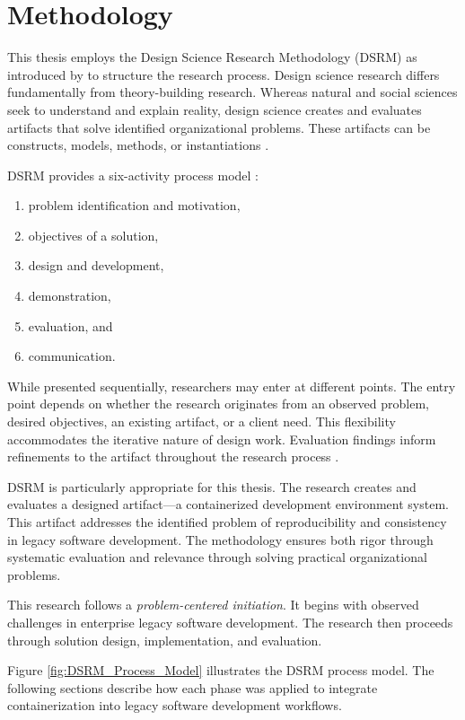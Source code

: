 \chapter{Methodology}
\label{ch:methodology}

This thesis employs the Design Science Research Methodology (DSRM) as introduced by \citet{peffersDesignScienceResearch2007} to structure the research process.
Design science research differs fundamentally from theory-building research.
Whereas natural and social sciences seek to understand and explain reality, design science creates and evaluates artifacts that solve identified organizational problems.
These artifacts can be constructs, models, methods, or instantiations \citep{peffersDesignScienceResearch2007}.

DSRM provides a six-activity process model \citep{peffersDesignScienceResearch2007}:
\begin{enumerate}
	\item problem identification and motivation,
	\item objectives of a solution,
	\item design and development,
	\item demonstration,
	\item evaluation, and
	\item communication.
\end{enumerate}
While presented sequentially, researchers may enter at different points.
The entry point depends on whether the research originates from an observed problem, desired objectives, an existing artifact, or a client need.
This flexibility accommodates the iterative nature of design work.
Evaluation findings inform refinements to the artifact throughout the research process \citep{peffersDesignScienceResearch2007}.

DSRM is particularly appropriate for this thesis.
The research creates and evaluates a designed artifact---a containerized development environment system.
This artifact addresses the identified problem of reproducibility and consistency in legacy software development.
The methodology ensures both rigor through systematic evaluation and relevance through solving practical organizational problems.

This research follows a \textit{problem-centered initiation}.
It begins with observed challenges in enterprise legacy software development.
The research then proceeds through solution design, implementation, and evaluation.

Figure \ref{fig:DSRM_Process_Model} illustrates the DSRM process model.
The following sections describe how each phase was applied to integrate containerization into legacy software development workflows.

